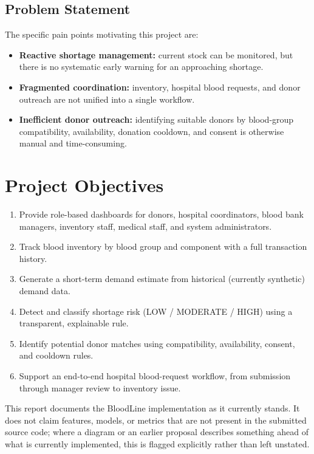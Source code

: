 \documentclass[12pt,twoside]{report}
\begin{document}
\subsection{Problem Statement}

The specific pain points motivating this project are:

\begin{itemize}
\item \textbf{Reactive shortage management:} current stock can be monitored, but there is no systematic early warning for an approaching shortage.
\item \textbf{Fragmented coordination:} inventory, hospital blood requests, and donor outreach are not unified into a single workflow.
\item \textbf{Inefficient donor outreach:} identifying suitable donors by blood-group compatibility, availability, donation cooldown, and consent is otherwise manual and time-consuming.
\end{itemize}

\section{Project Objectives}

\begin{enumerate}
\item Provide role-based dashboards for donors, hospital coordinators, blood bank managers, inventory staff, medical staff, and system administrators.
\item Track blood inventory by blood group and component with a full transaction history.
\item Generate a short-term demand estimate from historical (currently synthetic) demand data.
\item Detect and classify shortage risk (LOW / MODERATE / HIGH) using a transparent, explainable rule.
\item Identify potential donor matches using compatibility, availability, consent, and cooldown rules.
\item Support an end-to-end hospital blood-request workflow, from submission through manager review to inventory issue.
\end{enumerate}

This report documents the BloodLine implementation as it currently stands. It does not claim features, models, or metrics that are not present in the submitted source code; where a diagram or an earlier proposal describes something ahead of what is currently implemented, this is flagged explicitly rather than left unstated.
\end{document}
